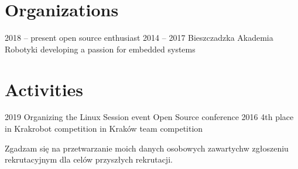 \documentclass[]{cv-style}
\begin{document}

\section{Organizations}

\begin{entrylist}
\entry
{2018 -- present}
{}
{open source enthusiast}
{\vspace{0.4cm}}
\entry
{2014 -- 2017}
{\quad Bieszczadzka Akademia Robotyki}
{developing a passion for embedded systems}
{\vspace{0.3cm}}

\end{entrylist}


\section{Activities}

\begin{entrylist}
\entry
{2019}
{Organizing the Linux Session event}
{Open Source conference}
{}
\entry
{2016}
{4th place in Krakrobot competition in Kraków}
{team competition}


\end{entrylist}


\vspace{1.5cm}


{\footnotesize Zgadzam się na przetwarzanie moich danych osobowych zawartych\newline w  zgłoszeniu rekrutacyjnym dla celów przyszłych rekrutacji.}
\end{document}
